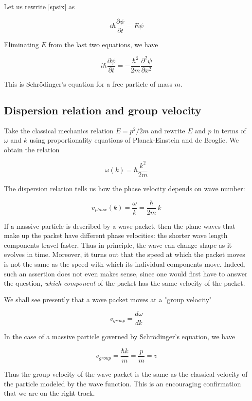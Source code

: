 Let us rewrite \eqref{spsix} as

\begin{equation}
i\hbar \frac{\partial\psi}{\partial t} = E\psi
\end{equation}

Eliminating $E$ from the last two equations, we have

\begin{equation}
i\hbar \frac{\partial\psi}{\partial t} = -\frac{\hbar^2}{2m} \frac{\partial^2 \psi}{\partial x^2}
\end{equation}

This is Schrödinger's equation for  a free particle of mass $m$.

\subsection{Dispersion relation and group velocity}

Take the classical mechanics relation  $E = p^2/2m$ and rewrite $E$ and $p$ in terms of $\omega$ and $k$ using proportionality equations of Planck-Einstein and de Broglie. We obtain the relation

\begin{equation}
\omega(k) = \hbar \frac{k^2}{2m}
\end{equation}

The dispersion relation tells us how the phase velocity  depends on wave number:

\begin{equation}
v_{phase}(k) = \frac{\omega}{k} = \frac{\hbar}{2m}\,k
\end{equation}

If a massive particle is described by a wave packet, then the plane waves that make up the packet have different phase velocities: the shorter wave length components travel faster.  Thus in principle, the wave can change shape as it evolves in time.  Moreover, it turns out that the speed at which the packet moves is not the same as the speed with which its individual components move.  Indeed, such an assertion does not even makes sense, since one would first have to answer the question, \emph{which component} of the packet has the same velocity of the packet.

We shall see presently that a wave packet moves at a "group velocity"

\begin{equation}
v_{group}  = \frac{d\omega}{dk}
\end{equation}

In the case of a massive particle governed by Schrödinger's equation,  we have

\begin{equation}
v_{group}  = \frac{\hbar k}{m} = \frac{p}{m} = v
\end{equation}

Thus the group velocity of the wave packet is the same as the classical velocity of the particle modeled by the wave function.  This is an encouraging confirmation that we are on the right track.
